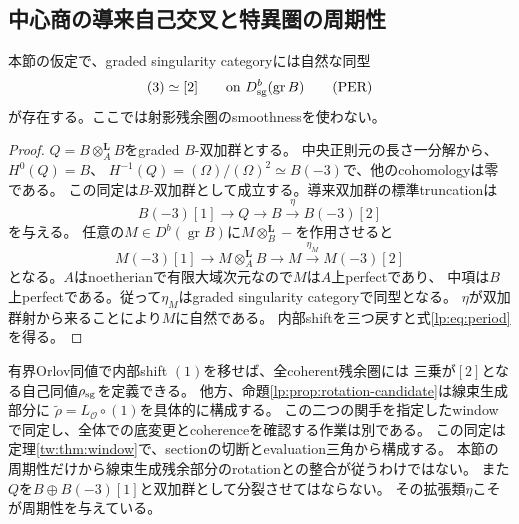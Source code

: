 \subsection{中心商の導来自己交叉と特異圏の周期性}
\begin{proposition}[三次周期性の代数的な構成]\label{lp:prop:sing-period}
本節の仮定で、graded singularity categoryには自然な同型
\[
 (3)\simeq[2]
 \qquad\text{on }D_{\rm sg}^b(\operatorname{gr}B)
 \tag{PER}\label{lp:eq:period}
\]
が存在する。ここでは射影残余圏のsmoothnessを使わない。
\end{proposition}
\begin{proof}
$Q=B\otimes_A^{\mathbf L}B$をgraded $B$-双加群とする。
中央正則元の長さ一分解から、$H^0(Q)=B$、
$H^{-1}(Q)=(\Omega)/(\Omega)^2\simeq B(-3)$で、他のcohomologyは零である。
この同定は$B$-双加群として成立する。導来双加群の標準truncationは
\[
 B(-3)[1]\longrightarrow Q\longrightarrow B
 \xrightarrow{\eta}B(-3)[2]
\]
を与える。
任意の$M\in D^b(\operatorname{gr}B)$に$M\otimes_B^{\mathbf L}-$を作用させると
\[
 M(-3)[1]\longrightarrow M\otimes_A^{\mathbf L}B\longrightarrow M
 \xrightarrow{\eta_M}M(-3)[2]
\]
となる。$A$はnoetherianで有限大域次元なので$M$は$A$上perfectであり、
中項は$B$上perfectである。従って$\eta_M$はgraded singularity categoryで同型となる。
$\eta$が双加群射から来ることにより$M$に自然である。
内部shiftを三つ戻すと式\eqref{lp:eq:period}を得る。
\end{proof}
\begin{remark}[二種類のrotationを混同しない]
有界Orlov同値で内部shift $(1)$を移せば、全coherent残余圏には
三乗が$[2]$となる自己同値$\rho_{\rm sg}$を定義できる。
他方、命題\ref{lp:prop:rotation-candidate}は線束生成部分に
$\widetilde\rho=L_{\mathcal O}\circ(1)$を具体的に構成する。
この二つの関手を指定したwindowで同定し、全体での底変更とcoherenceを確認する作業は別である。
この同定は定理\ref{tw:thm:window}で、sectionの切断とevaluation三角から構成する。
本節の周期性だけから線束生成残余部分のrotationとの整合が従うわけではない。
また$Q$を$B\oplus B(-3)[1]$と双加群として分裂させてはならない。
その拡張類$\eta$こそが周期性を与えている。
\end{remark}

